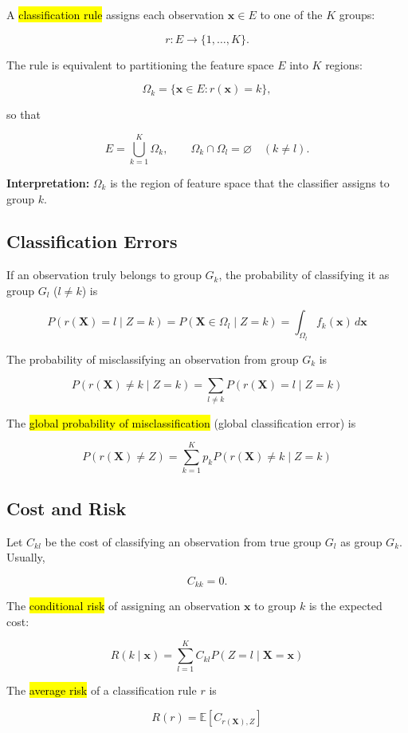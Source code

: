 \documentclass[a4paper,11pt]{article}
\begin{document}
A \hl{classification rule} assigns each observation $\mathbf{x}\in E$ to one
of the $K$ groups:

$$
r:E\rightarrow\{1,\ldots,K\}.
$$

The rule is equivalent to partitioning the feature space $E$ into $K$
regions:

$$
\Omega_k=\{\mathbf{x}\in E:r(\mathbf{x})=k\},
$$

so that

$$
E=\bigcup_{k=1}^K\Omega_k,
\qquad
\Omega_k\cap\Omega_l=\varnothing\quad(k\neq l).
$$

\textbf{Interpretation:} $\Omega_k$ is the region of feature space that the
classifier assigns to group $k$.

\subsection{Classification Errors}

If an observation truly belongs to group $G_k$, the probability of classifying
it as group $G_l$ ($l\neq k$) is

$$
\boxed{
P(r(\mathbf{X})=l\mid Z=k)
=
P(\mathbf{X}\in\Omega_l\mid Z=k)
=
\int_{\Omega_l}f_k(\mathbf{x})\,d\mathbf{x}
}
$$

The probability of misclassifying an observation from group $G_k$ is

$$
\boxed{
P(r(\mathbf{X})\neq k\mid Z=k)
=
\sum_{l\neq k}P(r(\mathbf{X})=l\mid Z=k)
}
$$

The \hl{global probability of misclassification} (global classification
error) is

$$
\boxed{
P(r(\mathbf{X})\neq Z)
=
\sum_{k=1}^K
p_kP(r(\mathbf{X})\neq k\mid Z=k)
}
$$

\subsection{Cost and Risk}

Let $C_{kl}$ be the cost of classifying an observation from true group
$G_l$ as group $G_k$. Usually,

$$
C_{kk}=0.
$$

The \hl{conditional risk} of assigning an observation $\mathbf{x}$ to group
$k$ is the expected cost:

$$
\boxed{
R(k\mid\mathbf{x})
=
\sum_{l=1}^K
C_{kl}P(Z=l\mid\mathbf{X}=\mathbf{x})
}
$$

The \hl{average risk} of a classification rule $r$ is

$$
\boxed{
R(r)=\mathbb{E}[C_{r(\mathbf{X}),Z}]
}
$$
\end{document}
